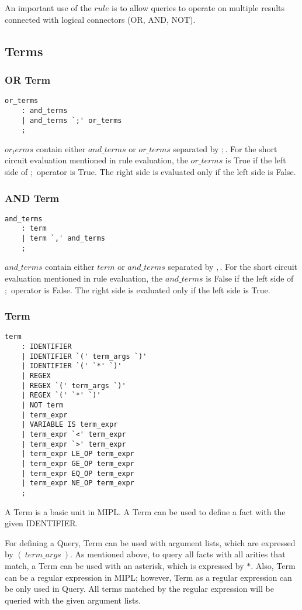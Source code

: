 \documentclass[prodmode,acmtecs]{acmsmall}
\begin{document}
An important use of the $rule$ is to allow queries to operate on multiple results connected 
with logical connectors (OR, AND, NOT).
\medskip

\subsection{Terms}
\subsubsection{OR Term}
\begin{lstlisting}
or_terms
	: and_terms
	| and_terms `;' or_terms
	;
\end{lstlisting}
$or_terms$ contain either $and\_terms$ or $or\_terms$ separated by $;$. 
For the short circuit evaluation mentioned in rule evaluation, the $or\_terms$
is True if the left side of $;$ operator is True. The right side is evaluated
only if the left side is False.

\medskip

\subsubsection{AND Term}
\begin{lstlisting}
and_terms
	: term
	| term `,' and_terms
	;
\end{lstlisting}
$and\_terms$ contain either $term$ or $and\_terms$ separated by $,$. 
For the short circuit evaluation mentioned in rule evaluation, the $and\_terms$
is False if the left side of $;$ operator is False. The right side is evaluated
only if the left side is True.
\medskip

\subsubsection{Term}
\begin{lstlisting}
term
	: IDENTIFIER		
	| IDENTIFIER `(' term_args `)'
	| IDENTIFIER `(' `*' `)'
	| REGEX			
	| REGEX `(' term_args `)'
	| REGEX `(' `*' `)'	
	| NOT term		
	| term_expr		
	| VARIABLE IS term_expr
	| term_expr `<' term_expr
	| term_expr `>' term_expr
	| term_expr LE_OP term_expr
	| term_expr GE_OP term_expr
	| term_expr EQ_OP term_expr
	| term_expr NE_OP term_expr
	;
\end{lstlisting}
A Term is a basic unit in MIPL. A Term can be used to define a fact with the
given IDENTIFIER.
\medskip

For defining a Query, Term can be used with argument lists, which are expressed by
$(\ term\_args\ )$. As mentioned above, to query all facts with all arities that match, 
a Term can be used with an asterisk, which
is expressed by $*$. Also, Term can be a regular expression in MIPL; however,
Term as a regular expression can be only used in Query. All terms matched by the
regular expression will be queried with the given argument lists.
\medskip
\end{document}
